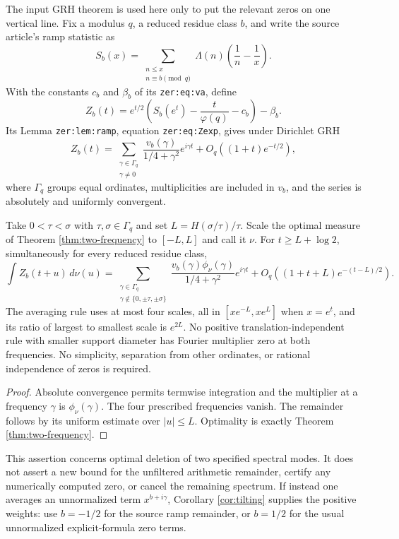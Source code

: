 The input GRH theorem is used here only to put the relevant zeros on
one vertical line. Fix a modulus $q$, a reduced residue class $b$, and
write the source article's ramp statistic as
\[
 S_b(x)=\sum_{\substack{n\le x\\n\equiv b\pmod q}}
              \Lambda(n)\left(\frac1n-\frac1x\right).
\]
With the constants $c_b$ and $\beta_b$ of its
\texttt{zer:eq:va}, define
\[
 Z_b(t)=e^{t/2}\left(S_b(e^t)-\frac{t}{\varphi(q)}-c_b\right)
                     -\beta_b.
\]
Its Lemma \texttt{zer:lem:ramp}, equation \texttt{zer:eq:Zexp}, gives
under Dirichlet GRH
\[
 Z_b(t)=\sum_{\substack{\gamma\in\Gamma_q\\\gamma\ne0}}
           \frac{v_b(\gamma)}{1/4+\gamma^2}e^{i\gamma t}
             +O_q((1+t)e^{-t/2}),
\]
where $\Gamma_q$ groups equal ordinates, multiplicities are included
in $v_b$, and the series is absolutely and uniformly convergent.

\begin{corollary}
\label{cor:prime-deletion}
Take $0<\tau<\sigma$ with $\tau,\sigma\in\Gamma_q$ and set
$L=H(\sigma/\tau)/\tau$. Scale the optimal measure of
Theorem \ref{thm:two-frequency} to $[-L,L]$ and call it $\nu$.
For $t\ge L+\log2$, simultaneously for every reduced residue class,
\[
 \int Z_b(t+u)\,d\nu(u)
 =\sum_{\substack{\gamma\in\Gamma_q\\
         \gamma\notin\{0,\pm\tau,\pm\sigma\}}}
       \frac{v_b(\gamma)\phi_\nu(\gamma)}{1/4+\gamma^2}
                     e^{i\gamma t}
       +O_q\left((1+t+L)e^{-(t-L)/2}\right).
\]
The averaging rule uses at most four scales, all in
$[xe^{-L},xe^L]$ when $x=e^t$, and its ratio of largest to smallest
scale is $e^{2L}$. No positive translation-independent rule with
smaller support diameter has Fourier multiplier zero at both
frequencies. No simplicity, separation from other ordinates, or
rational independence of zeros is required.
\end{corollary}

\begin{proof}
Absolute convergence permits termwise integration and the multiplier
at a frequency $\gamma$ is $\phi_\nu(\gamma)$. The four prescribed
frequencies vanish. The remainder follows by its uniform estimate
over $|u|\le L$. Optimality is exactly Theorem
\ref{thm:two-frequency}.
\end{proof}

This assertion concerns optimal deletion of two specified spectral
modes. It does not assert a new bound for the unfiltered arithmetic
remainder, certify any numerically computed zero, or cancel the
remaining spectrum. If instead one averages an unnormalized term
$x^{b+i\gamma}$, Corollary \ref{cor:tilting} supplies the positive
weights: use $b=-1/2$ for the source ramp remainder, or $b=1/2$ for
the usual unnormalized explicit-formula zero terms.

